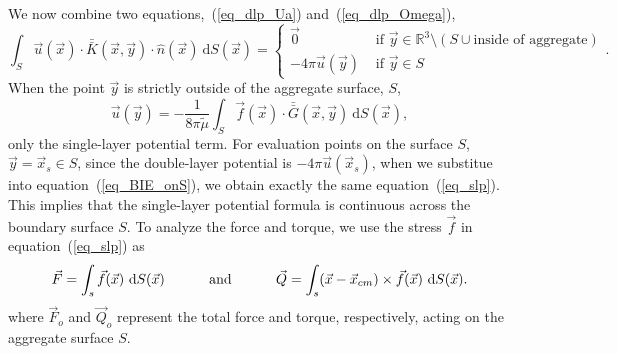 We now combine two equations,~(\ref{eq_dlp_Ua}) and~(\ref{eq_dlp_Omega}),
\begin{equation}
	\int_S \vec{u} ( \vec{x}) \cdot \bar{\bar{K}}(\vec{x},\vec{y}) \cdot \hat{n} ( \vec{x})
	\ \text{d}S(\vec{x})
	 = 
	 \begin{cases}
	  \vec{0}& \text{ if } \vec{y} \in \mathbb{R}^3  \setminus \left( S \cup {\text{inside of aggregate}}\right)
	  \\ 
	 - 4\pi \vec{u}(\vec{y}) & \text{ if } \vec{y} \in S 
	 \end{cases}.
	\label{eq_dlp_val_out}
\end{equation}
When the point $\vec{y}$ is strictly outside of the aggregate surface, $S$,
 \begin{equation}
    \vec{u}(\vec{y}) = - \frac{1}{8 \pi \tilde{\mu}} \int_S  \vec{f}(\vec{x}) \cdot \bar{\bar{G}}(\vec{x},\vec{y}) \ \text{d}S(\vec{x}) ,
 \label{eq_slp}
 \end{equation}
 only the single-layer potential term.
For evaluation points on the surface $S$, 
$\vec{y} = \vec{x}_s \in S$, 
since the double-layer potential is $- 4 \pi \vec{u}(\vec{x}_s)$, when we substitue into equation~(\ref{eq_BIE_onS}), 
we obtain exactly the same equation~(\ref{eq_slp}). This implies that the single-layer potential formula is continuous across the boundary surface $S$.
To analyze the force and torque, we use the stress $\vec{f}$ in equation~(\ref{eq_slp}) as
\begin{equation}
	\vec{F} = \int_s \vec{f}(\vec{x}) \  \text{d}S(\vec{x}) \hspace{1 cm} \text{ and } \hspace{1 cm}   \vec{Q} = \int_s (\vec{x} - \vec{x}_{cm}) \times \vec{f}(\vec{x})  \ \text{d}S(\vec{x}).
	\label{eq_total_FT}
\end{equation}
 where $\vec{F}_o$ and $\vec{Q}_o$ represent the total force and torque, respectively, acting on the aggregate surface $S$.
%

